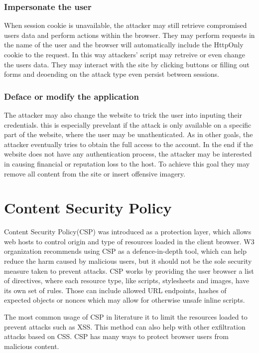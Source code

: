 \subsubsection{Impersonate the user}
When session cookie is unavailable, the attacker may still retrieve compromised users data and perform actions within the browser.
They may perform requests in the name of the user and the browser will automatically include the HttpOnly cookie to the request.
In this way attackers' script may retreive or even change the users data.
They may interact with the site by clicking buttons or filling out forms and deoending on the attack type even persist between sessions.

\subsubsection{Deface or modify the application}
The attacker may also change the website to trick the user into inputing their credentials.
this is especially prevelant if the attack is only available on a specific part of the website, where the user may be unathenticated.
As in other goals, the attacker eventually tries to obtain the full access to the account.
In the end if the website does not have any authentication process, the attacker may be interested in causing financial or reputation loss to the host.
To achieve this goal they may remove all content from the site or insert offensive imagery.

\section{Content Security Policy}
Content Security Policy(CSP) was introduced as a protection layer, which allows web hosts to control origin and type of resources loaded in the client browser. 
W3 organization recommends using CSP as a defence-in-depth tool, which can help reduce the harm caused by malicious users, but it should not be the sole security measure taken to prevent attacks. \cite{CSPLevel3}
CSP works by providing the user browser a list of directives, where each resource type, like scripts, stylesheets and images, have its own set of rules.
Those can include allowed URL endpoints, hashes of expected objects or nonces which may allow for otherwise unsafe inline scripts.

The most common usage of CSP in literature it to limit the resources loaded to prevent attacks such as XSS.
This method can also help with other exfiltration attacks based on CSS.
CSP has many ways to protect browser users from malicious content.


